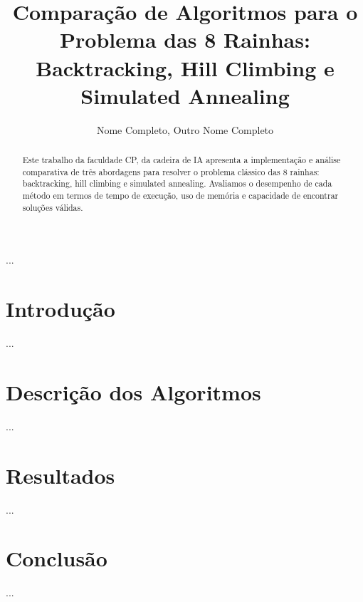 \documentclass[sbc]{sbccip}
\title{Comparação de Algoritmos para o Problema das 8 Rainhas: Backtracking, Hill Climbing e Simulated Annealing}
\author{Nome Completo\inst{1}, Outro Nome Completo\inst{1}}
\begin{document}
\maketitle

\begin{abstract}
Este trabalho da faculdade CP, da cadeira de IA apresenta a implementação e análise comparativa de três abordagens para resolver o problema clássico das 8 rainhas: backtracking, hill climbing e simulated annealing. Avaliamos o desempenho de cada método em termos de tempo de execução, uso de memória e capacidade de encontrar soluções válidas.
\end{abstract}

\begin{resumo}
...
\end{resumo}

\section{Introdução}
...

\section{Descrição dos Algoritmos}
...

\section{Resultados}
...

\section{Conclusão}
...

\begin{thebibliography}{99}


\end{thebibliography}
\end{document}
